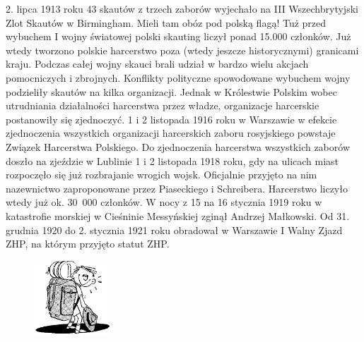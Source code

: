 2. lipca 1913 roku 43 skautów z trzech zaborów wyjechało na III Wszechbrytyjski Zlot Skautów w Birmingham. Mieli tam obóz pod polską flagą! Tuż przed wybuchem I wojny światowej polski skauting liczył ponad 15.000 członków. Już wtedy tworzono polskie harcerstwo poza (wtedy jeszcze historycznymi) granicami kraju. Podczas całej wojny skauci brali udział w bardzo wielu akcjach pomocniczych i zbrojnych. Konflikty polityczne spowodowane wybuchem wojny podzieliły skautów na kilka organizacji. Jednak w Królestwie Polskim wobec utrudniania działalności harcerstwa przez władze, organizacje harcerskie postanowiły się zjednoczyć. 1 i 2 listopada 1916 roku w Warszawie w efekcie zjednoczenia wszystkich organizacji harcerskich zaboru rosyjskiego powstaje Związek Harcerstwa Polskiego. Do zjednoczenia harcerstwa wszystkich zaborów doszło na zjeździe w Lublinie 1 i 2 listopada 1918 roku, gdy na ulicach miast rozpoczęło się już rozbrajanie wrogich wojsk. Oficjalnie przyjęto na nim nazewnictwo zaproponowane przez Piaseckiego i Schreibera. Harcerstwo liczyło wtedy już ok. 30~000 członków. W nocy z 15 na 16 stycznia 1919 roku w katastrofie morskiej w Cieśninie Messyńskiej zginął Andrzej Małkowski. Od 31. grudnia 1920 do 2. stycznia 1921 roku obradował w Warszawie I Walny Zjazd ZHP, na którym przyjęto statut ZHP. 
\begin{figure}
  \begin{center}
    \includegraphics[width=2.9cm]{grafiki/lipca.png}
  \end{center}
\end{figure}
